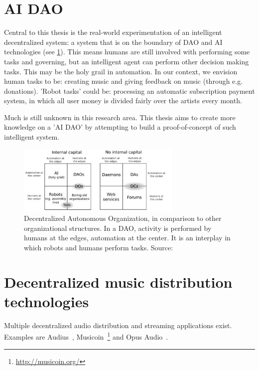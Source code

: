 \section{AI DAO}
Central to this thesis is the real-world experimentation of an intelligent decentralized system: a system that is on the boundary of DAO and AI technologies (see \ref{fig:dao-quadrants}). This means humans are still involved with performing some tasks and governing, but an intelligent agent can perform other decision making tasks. This may be the holy grail in automation. In our context, we envision human tasks to be: creating music and giving feedback on music (through e.g. donations). 'Robot tasks' could be: processing an automatic subscription payment system, in which all user money is divided fairly over the artists every month.

Much is still unknown in this research area. This thesis aims to create more knowledge on a 'AI DAO' by attempting to build a proof-of-concept of such intelligent system.

\begin{figure}
    \centering
    \includegraphics[width=0.7\textwidth]{introduction/dao-quadrants.jpg}
    \caption{Decentralized Autonomous Organization, in comparison to other organizational structures. In a DAO, activity is performed by humans at the edges, automation at the center. It is an interplay in which robots and humans perform tasks. Source: \cite{buterin2014dao}}
    \label{fig:dao-quadrants}
\end{figure}

\section{Decentralized music distribution technologies}
Multiple decentralized audio distribution and streaming applications exist. Examples are Audius~\citep{audius2018}, Musicoin~\footnote{\url{http://musicoin.org/}} and Opus Audio~\citep{jia2016opus}.

